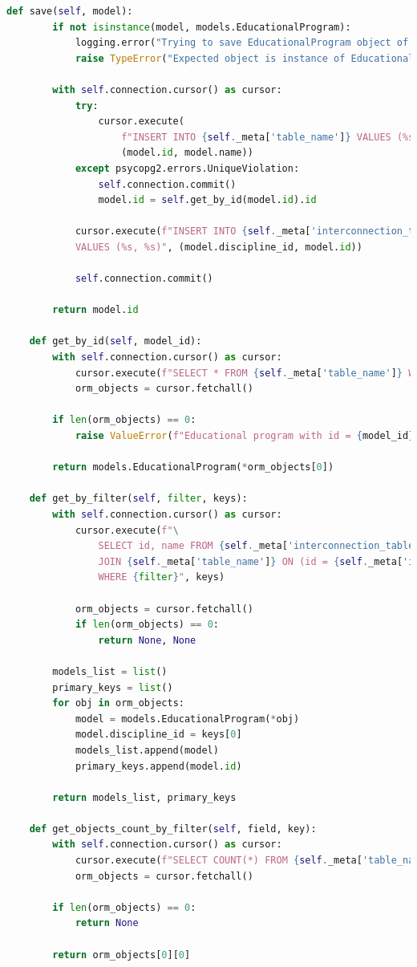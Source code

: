 \begin{lstlisting}[label=lst:db-postgresql, caption=Листинг модуля взаимодействия c СУБД PostgreSQL, language=python]
	def save(self, model):
		if not isinstance(model, models.EducationalProgram):
			logging.error("Trying to save EducationalProgram object of invalid type")
			raise TypeError("Expected object is instance of EducationalProgram")
	
		with self.connection.cursor() as cursor:
			try:
				cursor.execute(
					f"INSERT INTO {self._meta['table_name']} VALUES (%s, %s) RETURNING id",
					(model.id, model.name))
			except psycopg2.errors.UniqueViolation:
				self.connection.commit()
				model.id = self.get_by_id(model.id).id
			
			cursor.execute(f"INSERT INTO {self._meta['interconnection_table_name']} \
			VALUES (%s, %s)", (model.discipline_id, model.id))
			
			self.connection.commit()
			
		return model.id
	
	def get_by_id(self, model_id):
		with self.connection.cursor() as cursor:
			cursor.execute(f"SELECT * FROM {self._meta['table_name']} WHERE id = %s", (model_id,))
			orm_objects = cursor.fetchall()
		
		if len(orm_objects) == 0:
			raise ValueError(f"Educational program with id = {model_id} doesn't exists")
		
		return models.EducationalProgram(*orm_objects[0])
	
	def get_by_filter(self, filter, keys):
		with self.connection.cursor() as cursor:
			cursor.execute(f"\
				SELECT id, name FROM {self._meta['interconnection_table_name']} \
				JOIN {self._meta['table_name']} ON (id = {self._meta['ict_field_name']}) \
				WHERE {filter}", keys)
		
			orm_objects = cursor.fetchall()
			if len(orm_objects) == 0:
				return None, None
		
		models_list = list()
		primary_keys = list()
		for obj in orm_objects:
			model = models.EducationalProgram(*obj)
			model.discipline_id = keys[0]
			models_list.append(model)
			primary_keys.append(model.id)
		
		return models_list, primary_keys
	
	def get_objects_count_by_filter(self, field, key):
		with self.connection.cursor() as cursor:
			cursor.execute(f"SELECT COUNT(*) FROM {self._meta['table_name']} WHERE {field} = %s", (key,))
			orm_objects = cursor.fetchall()
		
		if len(orm_objects) == 0:
			return None
		
		return orm_objects[0][0]
	

\end{lstlisting}
